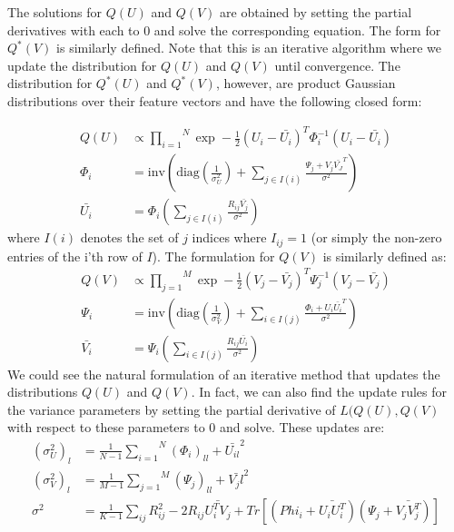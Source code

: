 \documentclass[journal,onecolumn]{IEEEtran}
\DeclareMathOperator{\E}{\mathbb{E}}
\begin{document}
The solutions for $ Q(U) $ and $ Q(V) $ are obtained by setting the partial derivatives with each to 0 and solve the corresponding equation. The form for $ Q^*(V) $ is similarly defined. Note that this is an iterative algorithm where we update the distribution for $ Q(U) $ and $ Q(V) $ until convergence. The distribution for $ Q^*(U) $ and $ Q^*(V) $, however, are product Gaussian distributions over their feature vectors and have the following closed form:

\begin{equation}
\begin{split}
Q(U) &\propto \overset{N}{\underset{i=1}{\prod}} \exp -\frac{1}{2} (U_i- \bar{U_i})^T \Phi_i^{-1}(U_i-\bar{U_i})\\
	\Phi_i &= \text{inv}(\text{diag}(\frac{1}{\sigma_U^2}) +\underset{j \in I(i)}{\sum} \frac{\Psi_j+V_j\bar{V_J}^T}{\sigma^2} ) \\
	\bar{U_i} &= \Phi_i(\underset{j \in I(i)}{\sum}\frac{R_{ij}\bar{V_j}}{\sigma^2})
\end{split} 
\end{equation}
where $ I(i) $ denotes the set of $ j $ indices where $ I_{ij} = 1$ (or simply the non-zero entries of the i'th row of $ I $). The formulation for $ Q(V) $ is similarly defined as:
\begin{equation}
\begin{split}
Q(V) &\propto \overset{M}{\underset{j=1}{\prod}} \exp -\frac{1}{2} (V_j- \bar{V_j})^T \Psi_j^{-1}(V_j-\bar{V_j})\\
\Psi_i &= \text{inv}(\text{diag}(\frac{1}{\sigma_V^2}) +\underset{i \in I(j)}{\sum} \frac{\Phi_i+U_i\bar{U_i}^T}{\sigma^2} ) \\
\bar{V_i} &= \Psi_i(\underset{i \in I(j)}{\sum}\frac{R_{ij}\bar{U_i}}{\sigma^2})
\end{split} 
\end{equation}
We could see the natural formulation of an iterative method that updates the distributions $ Q(U) $ and $ Q(V) $. In fact, we can also find the update rules for the variance parameters by setting the partial derivative of $ L(Q(U),Q(V) $ with respect to these parameters to 0 and solve. These updates are:
\begin{equation}
\begin{split}
(\sigma_U^2)_l &= \frac{1}{N-1} \overset{N}{\underset{i=1}{\sum}} (\Phi_i)_{ll} + \bar{U_{il}}^2\\
(\sigma_V^2)_l &= \frac{1}{M-1} \overset{M}{\underset{j=1}{\sum}} (\Psi_j)_{ll}+\bar{V_jl}^2\\
\sigma^2 &= \frac{1}{K-1} \underset{ij}{\sum} R_{ij}^2-2R_{ij}\bar{U_i^TV_j}+Tr[(Phi_i+\bar{U_iU_i^T})(\Psi_j+\bar{V_jV_j^T})]\\
\end{split}
\end{equation}
\end{document}
